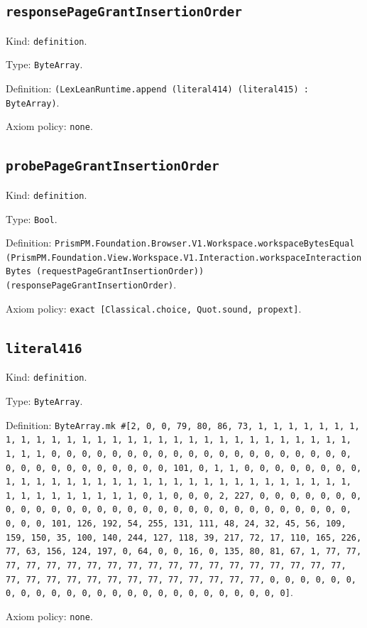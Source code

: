 \documentclass[11pt]{article}
\begin{document}
\subsection*{\texttt{responsePageGrantInsertionOrder}}
\noindent Kind: \texttt{definition}.\par
\noindent Type: \texttt{ByteArray}.\par
\noindent Definition: \texttt{(LexLeanRuntime.append (literal414) (literal415) : ByteArray)}.\par
\noindent Axiom policy: \texttt{none}.\par
\subsection*{\texttt{probePageGrantInsertionOrder}}
\noindent Kind: \texttt{definition}.\par
\noindent Type: \texttt{Bool}.\par
\noindent Definition: \texttt{PrismPM.Foundation.Browser.V1.Workspace.workspaceBytesEqual (PrismPM.Foundation.View.Workspace.V1.Interaction.workspaceInteractionBytes (requestPageGrantInsertionOrder)) (responsePageGrantInsertionOrder)}.\par
\noindent Axiom policy: \texttt{exact [Classical.choice, Quot.sound, propext]}.\par
\subsection*{\texttt{literal416}}
\noindent Kind: \texttt{definition}.\par
\noindent Type: \texttt{ByteArray}.\par
\noindent Definition: \texttt{ByteArray.mk \#[2, 0, 0, 79, 80, 86, 73, 1, 1, 1, 1, 1, 1, 1, 1, 1, 1, 1, 1, 1, 1, 1, 1, 1, 1, 1, 1, 1, 1, 1, 1, 1, 1, 1, 1, 1, 1, 1, 1, 1, 0, 0, 0, 0, 0, 0, 0, 0, 0, 0, 0, 0, 0, 0, 0, 0, 0, 0, 0, 0, 0, 0, 0, 0, 0, 0, 0, 0, 0, 0, 0, 101, 0, 1, 1, 0, 0, 0, 0, 0, 0, 0, 0, 1, 1, 1, 1, 1, 1, 1, 1, 1, 1, 1, 1, 1, 1, 1, 1, 1, 1, 1, 1, 1, 1, 1, 1, 1, 1, 1, 1, 1, 1, 1, 1, 0, 1, 0, 0, 0, 2, 227, 0, 0, 0, 0, 0, 0, 0, 0, 0, 0, 0, 0, 0, 0, 0, 0, 0, 0, 0, 0, 0, 0, 0, 0, 0, 0, 0, 0, 0, 0, 0, 0, 0, 101, 126, 192, 54, 255, 131, 111, 48, 24, 32, 45, 56, 109, 159, 150, 35, 100, 140, 244, 127, 118, 39, 217, 72, 17, 110, 165, 226, 77, 63, 156, 124, 197, 0, 64, 0, 0, 16, 0, 135, 80, 81, 67, 1, 77, 77, 77, 77, 77, 77, 77, 77, 77, 77, 77, 77, 77, 77, 77, 77, 77, 77, 77, 77, 77, 77, 77, 77, 77, 77, 77, 77, 77, 77, 77, 77, 0, 0, 0, 0, 0, 0, 0, 0, 0, 0, 0, 0, 0, 0, 0, 0, 0, 0, 0, 0, 0, 0, 0, 0, 0]}.\par
\noindent Axiom policy: \texttt{none}.\par
\end{document}
